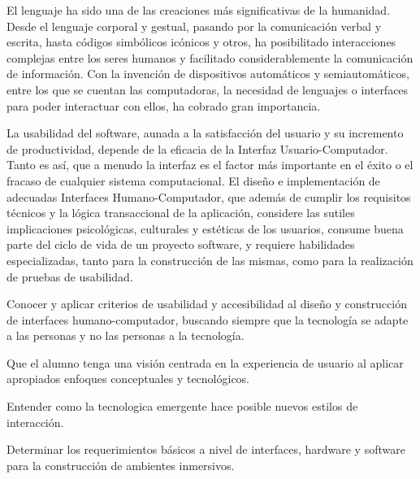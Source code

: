 \begin{syllabus}


\begin{justification}
El lenguaje ha sido una de las creaciones más significativas de la humanidad. Desde el lenguaje corporal y gestual, 
pasando por la comunicación verbal y escrita, hasta códigos simbólicos icónicos y otros, ha posibilitado interacciones complejas 
entre los seres humanos y facilitado considerablemente la comunicación de información. 
Con la invención de dispositivos automáticos y semiautomáticos, entre los que se cuentan las computadoras, 
la necesidad de lenguajes o interfaces para poder interactuar con ellos, ha cobrado gran importancia. 

La usabilidad del software, aunada a la satisfacción del usuario y su incremento de productividad, depende de la eficacia de la Interfaz Usuario-Computador.
Tanto es así, que a menudo la interfaz es el factor más importante en el éxito o el fracaso de cualquier sistema computacional. 
El diseño e implementación de adecuadas Interfaces Humano-Computador, que además de cumplir los requisitos técnicos y la 
lógica transaccional de la aplicación, considere las sutiles implicaciones psicológicas, culturales y estéticas de los usuarios, 
consume buena parte del ciclo de vida de un proyecto software, y requiere habilidades especializadas, 
tanto para la construcción de las mismas, como para la realización de pruebas de usabilidad.
\end{justification}

\begin{goals}
\item Conocer y aplicar criterios de usabilidad y accesibilidad al diseño y construcción de interfaces humano-computador, 
      buscando siempre que la tecnología se adapte a las personas y no las personas a la tecnología.
\item Que el alumno tenga una visión centrada en la experiencia de usuario al aplicar apropiados enfoques conceptuales y tecnológicos.
\item Entender como la tecnologica emergente hace posible nuevos estilos de interacción. 
\item Determinar los requerimientos básicos a nivel de interfaces, hardware y software para la construcción de ambientes inmersivos.
\end{goals}

\begin{outcomes}
    \item {}
    \item {}
    \item {}
    \item {}
    \item {}
    \item {}
\end{outcomes}


\end{syllabus}
